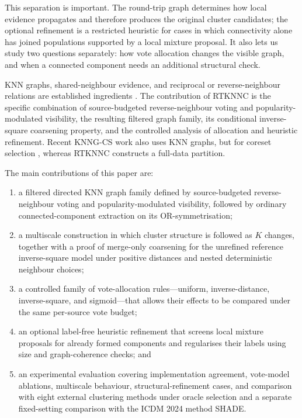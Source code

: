 \documentclass[pdflatex,sn-basic,Numbered]{sn-jnl}
\begin{document}
This separation is important. The round-trip graph determines how local
evidence propagates and therefore produces the original cluster candidates; the
optional refinement is a restricted heuristic for cases in which connectivity
alone has joined populations supported by a local mixture proposal. It also lets us study two
questions separately: how vote allocation changes the visible graph, and when a
connected component needs an additional structural check.

KNN graphs, shared-neighbour evidence, and reciprocal or reverse-neighbour
relations are established ingredients
\citep{JarvisPatrick1973,Ertoz2003SNN,BritoChavezQuirozYukich1997,ChowdhuryAmorim2018,XieLeeWangChenZhou2019}.
The contribution of RTKNNC is the specific combination of source-budgeted
reverse-neighbour voting and popularity-modulated visibility, the resulting
filtered graph family, its conditional inverse-square coarsening property,
and the controlled analysis of allocation and heuristic refinement. Recent
KNNG-CS work also uses KNN graphs, but for coreset selection
\citep{LiuEtAl2026KNNGCS}, whereas RTKNNC constructs a full-data partition.

The main contributions of this paper are:
\begin{enumerate}
\item a filtered directed KNN graph family defined by source-budgeted
reverse-neighbour voting and popularity-modulated visibility, followed by
ordinary connected-component extraction on its OR-symmetrisation;
\item a multiscale construction in which cluster structure is followed as $K$
changes, together with a proof of merge-only coarsening for the unrefined
reference inverse-square model under positive distances and nested
deterministic neighbour choices;
\item a controlled family of vote-allocation rules---uniform,
inverse-distance, inverse-square, and sigmoid---that allows their effects to be
compared under the same per-source vote budget;
\item an optional label-free heuristic refinement that screens local mixture
proposals for already formed components and regularises their labels using
size and graph-coherence checks; and
\item an experimental evaluation covering implementation agreement, vote-model
ablations, multiscale behaviour, structural-refinement cases, and comparison
with eight external clustering methods under oracle selection and a separate
fixed-setting comparison with the ICDM 2024 method SHADE.
\end{enumerate}
\end{document}
